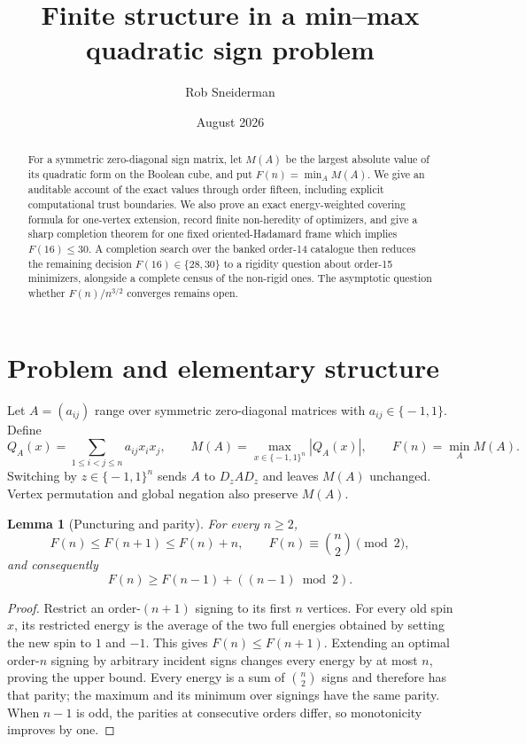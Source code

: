 \documentclass[11pt]{article}
\title{Finite structure in a min--max quadratic sign problem}
\author{Rob Sneiderman}
\date{August 2026}
\newcommand{\eps}{\{\!-1,1\!\}}
\newtheorem{lemma}[theorem]{Lemma}
\theoremstyle{remark}
\begin{document}
\maketitle

\begin{abstract}
For a symmetric zero-diagonal sign matrix, let $M(A)$ be the largest absolute
value of its quadratic form on the Boolean cube, and put
$F(n)=\min_A M(A)$.  We give an auditable account of the exact values through
order fifteen, including explicit computational trust boundaries.  We also
prove an exact energy-weighted covering formula for one-vertex extension,
record finite non-heredity of optimizers, and give a sharp completion theorem
for one fixed oriented-Hadamard frame which implies $F(16)\le30$.  A
completion search over the banked order-14 catalogue then reduces the
remaining decision $F(16)\in\{28,30\}$ to a rigidity question about
order-15 minimizers, alongside a complete census of the non-rigid ones.
The asymptotic question whether $F(n)/n^{3/2}$ converges remains open.
\end{abstract}

\begin{center}
\end{center}

\section{Problem and elementary structure}

Let $A=(a_{ij})$ range over symmetric zero-diagonal matrices with
$a_{ij}\in\eps$.  Define
\[
 Q_A(x)=\sum_{1\le i<j\le n}a_{ij}x_ix_j,
 \qquad M(A)=\max_{x\in\eps^n}|Q_A(x)|,
 \qquad F(n)=\min_A M(A).
\]
Switching by $z\in\eps^n$ sends $A$ to $D_zAD_z$ and leaves $M(A)$
unchanged.  Vertex permutation and global negation also preserve $M(A)$.

\begin{lemma}[Puncturing and parity]
For every $n\ge2$,
\[
 F(n)\le F(n+1)\le F(n)+n,
 \qquad
 F(n)\equiv\binom n2\pmod2,
\]
and consequently
\[
 F(n)\ge F(n-1)+((n-1)\bmod2).
\]
\end{lemma}

\begin{proof}
Restrict an order-$(n+1)$ signing to its first $n$ vertices.  For every old
spin $x$, its restricted energy is the average of the two full energies
obtained by setting the new spin to $1$ and $-1$.  This gives
$F(n)\le F(n+1)$.  Extending an optimal order-$n$ signing by arbitrary
incident signs changes every energy by at most $n$, proving the upper bound.
Every energy is a sum of $\binom n2$ signs and therefore has that parity; the
maximum and its minimum over signings have the same parity.  When $n-1$ is
odd, the parities at consecutive orders differ, so monotonicity improves by
one.
\end{proof}
\end{document}
